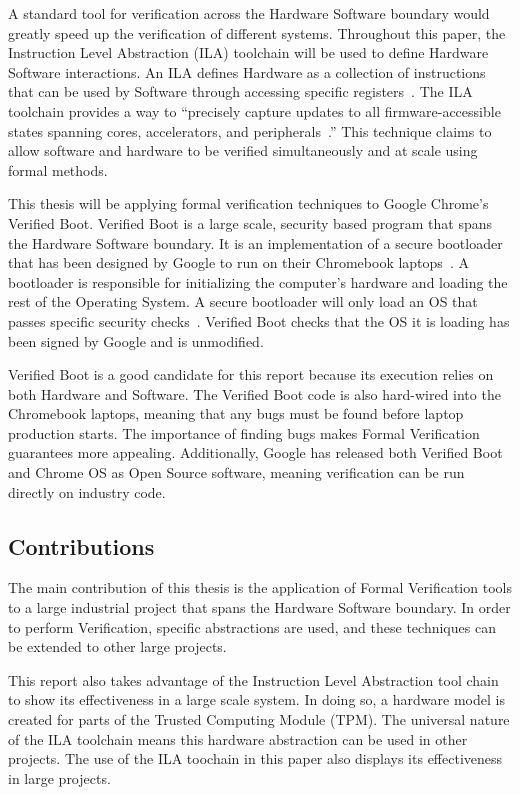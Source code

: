 A standard tool for verification across the Hardware Software boundary would
greatly speed up the verification of different systems.
Throughout this paper, the  Instruction Level Abstraction (ILA) toolchain will be used to define Hardware Software interactions.
An ILA defines Hardware as a collection of instructions that can be used by
Software through accessing specific registers~\cite{ila}.
The ILA toolchain provides a way to ``precisely capture updates to all firmware-accessible states spanning cores, accelerators, and peripherals~\cite{ila-template}.''
This technique claims to allow software and hardware to be verified simultaneously and at scale using formal methods.

This thesis will be applying formal verification techniques to Google Chrome's
Verified Boot.
Verified Boot is a large scale, security based program that spans the Hardware
Software boundary. 
It is an implementation of a secure bootloader that has been designed by Google to run on their Chromebook laptops~\cite{vboot}.
A bootloader is responsible for initializing the computer's hardware and
loading the rest of the Operating System.
A secure bootloader will only load an OS that passes specific
security checks~\cite{secure-bootloader}.
Verified Boot checks that the OS it is loading has been signed by Google and is
unmodified.

Verified Boot is a good candidate for this report because its execution relies
on both Hardware and Software.
The Verified Boot code is also hard-wired into the Chromebook laptops, meaning
that any bugs must be found before laptop production starts.
The importance of finding bugs makes Formal Verification guarantees more appealing.
Additionally, Google has released both Verified Boot and Chrome OS as Open
Source software, meaning verification can be run directly on industry code.

\subsection{Contributions}

The main contribution of this thesis is the application of Formal Verification
tools to a large industrial project that spans the Hardware Software boundary.
In order to perform Verification, specific abstractions are used, and these
techniques can be extended to other large projects.

This report also takes advantage of the Instruction Level Abstraction tool chain
to show its effectiveness in a large scale system.
In doing so, a hardware model is created for parts of the Trusted Computing
Module (TPM).
The universal nature of the ILA toolchain means this hardware abstraction can be used in other projects.
The use of the ILA toochain in this paper also displays its effectiveness in large projects.

